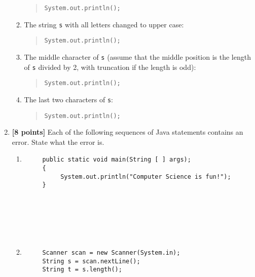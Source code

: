 \documentclass[11pt]{report}
\begin{document}
\begin{enumerate}
\begin{enumerate}
\bigskip
\bigskip
\bigskip
\begin{quote}
\verb$System.out.println($\underline{\hspace{3in}}\verb$);$
\end{quote}
\item
The string {\tt s} with all letters changed to upper case:

\bigskip
\bigskip
\bigskip
\begin{quote}
\verb$System.out.println($\underline{\hspace{3in}}\verb$);$
\end{quote}


\item
The middle character of {\tt s} (assume that the middle position is
the length of {\tt s} divided by 2, with truncation if the length is
odd):

\bigskip
\bigskip
\bigskip
\begin{quote}
\verb$System.out.println($\underline{\hspace{3in}}\verb$);$
\end{quote}

\item
The last two characters of {\tt s}:

\bigskip
\bigskip
\bigskip
\begin{quote}
\verb$System.out.println($\underline{\hspace{3in}}\verb$);$
\end{quote}
\end{enumerate}

\bigskip
\item {\bf [8 points]}
Each of the following sequences of Java statements contains an
error. State what the error is.
\begin{enumerate}
\item \mbox{}

\begin{verbatim}
     public static void main(String [ ] args);
     {
          System.out.println("Computer Science is fun!");
     }
     
     
     
     
     
     
\end{verbatim}
\item \mbox{}

\begin{verbatim}
     Scanner scan = new Scanner(System.in);
     String s = scan.nextLine();
     String t = s.length();
     

\end{verbatim}
\end{enumerate}
\end{enumerate}
\end{document}

